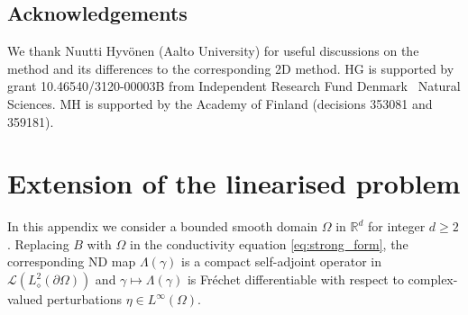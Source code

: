 \documentclass[reqno]{amsart}
\numberwithin{equation}{section}
\numberwithin{figure}{section}
\numberwithin{table}{section}
\theoremstyle{plain}
\theoremstyle{definition}
\theoremstyle{remark}
\newcommand{\R}{\mathbb{R}}
\begin{document}
\subsection*{Acknowledgements}

We thank Nuutti Hyv\"onen (Aalto University) for useful discussions on the method and its differences to the corresponding 2D method. HG is supported by grant 10.46540/3120-00003B from Independent Research Fund Denmark \textbar\ Natural Sciences. MH is supported by the Academy of Finland (decisions 353081 and 359181).

\appendix

\section{Extension of the linearised problem} \label{sec:extension}

In this appendix we consider a bounded smooth domain $\Omega$ in $\R^d$ for integer $d\geq 2$. Replacing $B$ with $\Omega$ in the conductivity equation \eqref{eq:strong_form}, the corresponding ND map $\Lambda(\gamma)$ is a compact self-adjoint operator in $\mathscr{L}(L^2_\diamond(\partial\Omega))$ and $\gamma\mapsto \Lambda(\gamma)$ is Fr\'echet differentiable with respect to complex-valued perturbations $\eta \in L^\infty(\Omega)$. 
\end{document}
